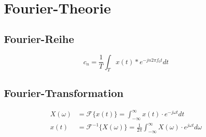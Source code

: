 \section{Fourier-Theorie}
\subsection{Fourier-Reihe}
\[
c_n = \frac{1}{T}\int_{T}^{}x(t)*e^{-jn2\pi f_0 t}dt
\]

\subsection{Fourier-Transformation}
\begin{align*}
	X(\omega) &= \mathcal{F}\{x(t)\} = \int_{-\infty}^{\infty}x(t)\cdot e^{-j\omega t}dt \\
	x(t) &= \mathcal{F^{-1}}\{X(\omega)\} = \frac{1}{2\pi}\int_{-\infty}^{\infty}X(\omega)\cdot e^{j\omega t}d\omega \\
\end{align*}


